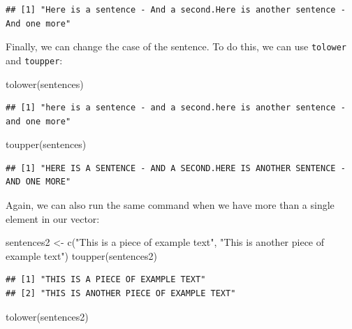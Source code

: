 \documentclass[
]{book}
\newenvironment{Shaded}{\begin{snugshade}}{\end{snugshade}}
\newcommand{\FunctionTok}[1]{\textcolor[rgb]{0.00,0.00,0.00}{#1}}
\newcommand{\NormalTok}[1]{#1}
\newcommand{\OtherTok}[1]{\textcolor[rgb]{0.56,0.35,0.01}{#1}}
\newcommand{\StringTok}[1]{\textcolor[rgb]{0.31,0.60,0.02}{#1}}
\begin{document}
\begin{verbatim}
## [1] "Here is a sentence - And a second.Here is another sentence - And one more"
\end{verbatim}

Finally, we can change the case of the sentence. To do this, we can use \texttt{tolower} and \texttt{toupper}:

\begin{Shaded}
\begin{Highlighting}[]
\FunctionTok{tolower}\NormalTok{(sentences)}
\end{Highlighting}
\end{Shaded}

\begin{verbatim}
## [1] "here is a sentence - and a second.here is another sentence - and one more"
\end{verbatim}

\begin{Shaded}
\begin{Highlighting}[]
\FunctionTok{toupper}\NormalTok{(sentences)}
\end{Highlighting}
\end{Shaded}

\begin{verbatim}
## [1] "HERE IS A SENTENCE - AND A SECOND.HERE IS ANOTHER SENTENCE - AND ONE MORE"
\end{verbatim}

Again, we can also run the same command when we have more than a single element in our vector:

\begin{Shaded}
\begin{Highlighting}[]
\NormalTok{sentences2 }\OtherTok{\textless{}{-}} \FunctionTok{c}\NormalTok{(}\StringTok{"This is a piece of example text"}\NormalTok{, }\StringTok{"This is another piece of example text"}\NormalTok{)}
\FunctionTok{toupper}\NormalTok{(sentences2)}
\end{Highlighting}
\end{Shaded}

\begin{verbatim}
## [1] "THIS IS A PIECE OF EXAMPLE TEXT"      
## [2] "THIS IS ANOTHER PIECE OF EXAMPLE TEXT"
\end{verbatim}

\begin{Shaded}
\begin{Highlighting}[]
\FunctionTok{tolower}\NormalTok{(sentences2)}
\end{Highlighting}
\end{Shaded}
\end{document}
